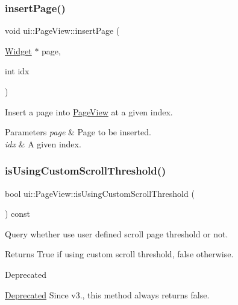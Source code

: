 \subsubsection{\texorpdfstring{insert\+Page()}{insertPage()}\hspace{0.1cm}{\footnotesize\ttfamily [2/2]}}
{\footnotesize\ttfamily void ui\+::\+Page\+View\+::insert\+Page (\begin{DoxyParamCaption}\item[{\hyperlink{classui_1_1Widget}{Widget} $\ast$}]{page,  }\item[{int}]{idx }\end{DoxyParamCaption})}

Insert a page into \hyperlink{classui_1_1PageView}{Page\+View} at a given index.


\begin{DoxyParams}{Parameters}
{\em page} & Page to be inserted. \\
\hline
{\em idx} & A given index. \\
\hline
\end{DoxyParams}
\mbox{\label{classui_1_1PageView_a8c41a825d4f568fc6b9e5968c8ecfb71}} 
\subsubsection{\texorpdfstring{is\+Using\+Custom\+Scroll\+Threshold()}{isUsingCustomScrollThreshold()}\hspace{0.1cm}{\footnotesize\ttfamily [1/2]}}
{\footnotesize\ttfamily bool ui\+::\+Page\+View\+::is\+Using\+Custom\+Scroll\+Threshold (\begin{DoxyParamCaption}{ }\end{DoxyParamCaption}) const}



Query whether use user defined scroll page threshold or not. 

\begin{DoxyReturn}{Returns}
True if using custom scroll threshold, false otherwise. 
\end{DoxyReturn}
\begin{DoxyRefDesc}{Deprecated}
\item[\hyperlink{deprecated__deprecated000154}{Deprecated}]Since v3., this method always returns false. \end{DoxyRefDesc}
\mbox{\label{classui_1_1PageView_ae867b3f9b2753cfc5851440d9b36f90e}} 
